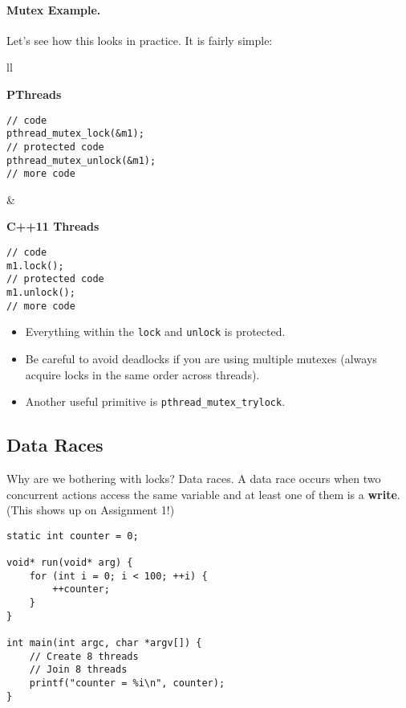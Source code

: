   \paragraph{Mutex Example.} Let's see how this looks in practice. It is fairly simple:
  
    \begin{tabular}{ll}
      \begin{minipage}{.5\textwidth}
        {\bf PThreads}
  \begin{verbatim}
// code
pthread_mutex_lock(&m1);
// protected code
pthread_mutex_unlock(&m1);
// more code
  \end{verbatim}
      \end{minipage}&
      \begin{minipage}{.35\textwidth}
        {\bf C++11 Threads}
  \begin{verbatim}
// code
m1.lock();
// protected code
m1.unlock();
// more code
  \end{verbatim}
      \end{minipage}
    \end{tabular}
  \begin{itemize}
    \item Everything within the {\tt lock} and {\tt unlock} is protected.
    \item Be careful to avoid deadlocks if you are using multiple mutexes (always
acquire locks in the same order across threads).
    \item Another useful primitive is {\tt pthread\_mutex\_trylock}.
  \end{itemize}

  \subsection*{Data Races}
  \vspace*{-1em}
Why are we bothering with locks? Data races. A data race occurs when
two concurrent actions access the same variable and at least one of
them is a {\bf write}. (This shows up on Assignment 1!)

  \begin{verbatim}
static int counter = 0;

void* run(void* arg) {
    for (int i = 0; i < 100; ++i) {
        ++counter;
    }
}

int main(int argc, char *argv[]) {
    // Create 8 threads
    // Join 8 threads
    printf("counter = %i\n", counter);
}
  \end{verbatim}

